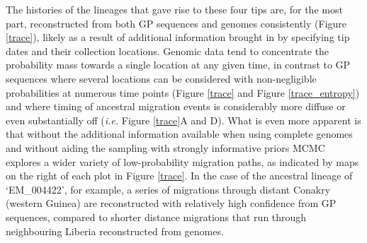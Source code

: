 \documentclass[11pt,oneside,letterpaper]{article}
\begin{document}

The histories of the lineages that gave rise to these four tips are, for the most part, reconstructed from both GP sequences and genomes consistently (Figure \ref{trace}), likely as a result of additional information brought in by specifying tip dates and their collection locations.
Genomic data tend to concentrate the probability mass towards a single location at any given time, in contrast to GP sequences where several locations can be considered with non-negligible probabilities at numerous time points (Figure \ref{trace} and Figure \ref{trace_entropy}) and where timing of ancestral migration events is considerably more diffuse or even substantially off (\textit{i.e.} Figure \ref{trace}A and D).
What is even more apparent is that without the additional information available when using complete genomes and without aiding the sampling with strongly informative priors MCMC explores a wider variety of low-probability migration paths, as indicated by maps on the right of each plot in Figure \ref{trace}.
In the case of the ancestral lineage of `EM\_004422', for example, a series of migrations through distant Conakry (western Guinea) are reconstructed with relatively high confidence from GP sequences, compared to shorter distance migrations that run through neighbouring Liberia reconstructed from genomes.
\end{document}
